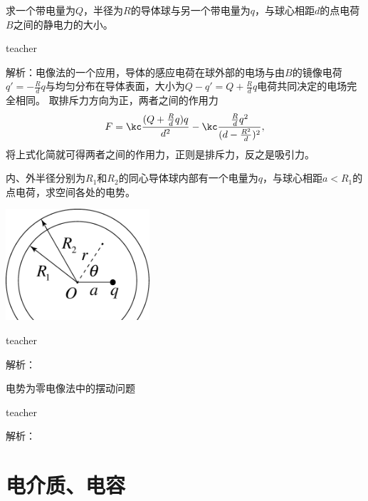 \begin{example}
求一个带电量为$Q$，半径为$R$的导体球与另一个带电量为$q$，与球心相距$d$的点电荷$B$之间的静电力的大小。
\begin{taggedblock}{teacher}

解析：电像法的一个应用，导体的感应电荷在球外部的电场与由$B$的镜像电荷$q' = - \frac{R}{d}q$与均匀分布在导体表面，大小为$Q-q' = Q + \frac{R}{d}q$电荷共同决定的电场完全相同。
取排斥力方向为正，两者之间的作用力
\[
F = \kc \frac{(Q+\frac{R}{d}q)q}{d^2}-\kc \frac{ \frac{R}{d}q^2}{(d- \frac{R^2}{d})^2},
\]
将上式化简就可得两者之间的作用力，正则是排斥力，反之是吸引力。
\end{taggedblock}
\end{example}


\begin{example}
内、外半径分别为$R_1$和$R_2$的同心导体球内部有一个电量为$q$，与球心相距$a<R_1$的点电荷，求空间各处的电势。
\begin{flushright}
\includegraphics[width=0.4\textwidth]{images/elec-problem-14.pdf}
\end{flushright}
\begin{taggedblock}{teacher}

解析：
\end{taggedblock}
\end{example}

\begin{example}
电势为零电像法中的摆动问题
\begin{taggedblock}{teacher}

解析：
\end{taggedblock}
\end{example}






\section{电介质、电容}

